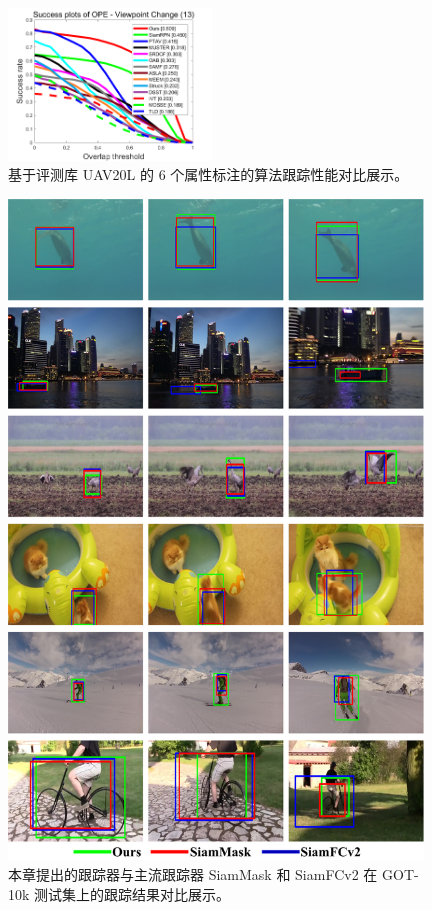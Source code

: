 \begin{figure}[t!]
\begin{center}
	\includegraphics[width=0.48\textwidth]{Img/globally/UAV20L/VC_overlap_OPE_AUC.png}
\end{center}
   \caption{基于评测库 UAV20L \cite{mueller2016benchmark} 的 6 个属性标注的算法跟踪性能对比展示。}
\label{fig:globally_uav20l_2}
\end{figure}

\nopagebreak[3]
\begin{figure}[p!]
    \centering
    \includegraphics[width=0.98\textwidth]{Img/globally/visulization.pdf}
    \caption{本章提出的跟踪器与主流跟踪器 SiamMask \cite{Wang2018SiamMask} 和 SiamFCv2 \cite{SiamFC} 在 GOT-10k \cite{GOT-10k} 测试集上的跟踪结果对比展示。}
    \label{fig:gloablly_vis}
\end{figure}
\nopagebreak[3]

